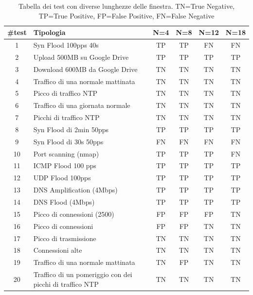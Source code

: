 \begin{table}
    \begin{tabularx}{\textwidth}{||c X c c c c||} 
        \hline
        \#test & Tipologia & N=4 & N=8 & N=12 & N=18\\ [0.5ex] 
        \hline\hline
        1 & Syn Flood 100pps 40s & TP & TP & \cellcolor{magenta} FN & \cellcolor{magenta} FN\\ 
        \hline
        2 & Upload 500MB su Google Drive & TP & TP & TP & TP\\ 
        \hline
        3 &  Download 600MB da Google Drive & TN  & TN & TN & TN\\ 
        \hline 
        4 & Traffico di una normale mattinata & TN & TN & TN & TN\\
        \hline
        5 & Picco di traffico NTP & TN & TN & TN & TN\\
        \hline
        6 & Traffico di una giornata normale & TN & TN & TN & TN\\ 
        \hline
        7 & Picchi di traffico NTP & TN & TN & TN & TN\\ 
        \hline 
        8 & Syn Flood di 2min 50pps & TP & TP & TP & TP\\
        \hline
        9 & Syn Flood di 30s 50pps & \cellcolor{magenta} FN & \cellcolor{magenta} FN & \cellcolor{magenta} FN & \cellcolor{magenta} FN\\        
        \hline
        10 & Port scanning (nmap) & TP & TP & TP & \cellcolor{magenta} FN\\
        \hline
        11 & ICMP Flood 100 pps & TP & TP & TP & TP\\
        \hline
        12 & UDP Flood 100pps & TP & TP & TP & TP\\ 
        \hline
        13 & DNS Amplification (4Mbps) & TP & TP & TP & TP\\ 
        \hline 
        14 & DNS Flood (4Mbps) & TP & TP & TP & TP\\
        \hline
        15 & Picco di connessioni (2500) & \cellcolor{orange} FP & \cellcolor{orange} FP & \cellcolor{orange} FP & TN \\        
        \hline 
        16 & Picco di connessioni & \cellcolor{orange} FP & \cellcolor{orange} FP & TN & TN\\        
        \hline
        17 & Picco di trasmissione & TN & TN & TN & TN\\        
        \hline
        18 & Connessioni alte & TN & TN & TN & TN\\
        \hline
        19 & Traffico di una normale mattinata & TN & \cellcolor{orange} FP & TN & TN\\ 
        \hline
        20 & Traffico di un pomeriggio con dei picchi di traffico NTP & TN & TN & TN & TN\\ 
        \hline
    \end{tabularx}
    \caption{Tabella dei test con diverse lunghezze delle finestra. TN=True Negative, TP=True Positive,  FP=False Positive,  FN=False Negative}
    \label{table:finestra}
\end{table}

